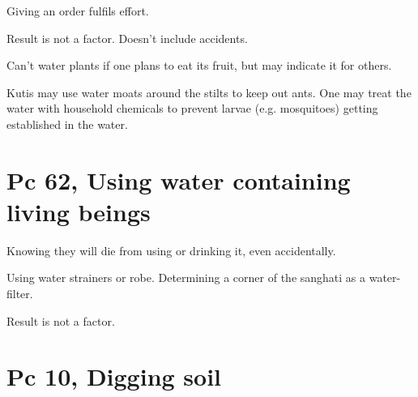 Giving an order fulfils effort.

Result is not a factor. Doesn't include accidents.

Can't water plants if one plans to eat its fruit, but may indicate it
for others.

Kutis may use water moats around the stilts to keep out ants. One may
treat the water with household chemicals to prevent larvae (e.g.
mosquitoes) getting established in the water.

\section{Pc 62, Using water containing living beings}

\enlargethispage{\baselineskip}

Knowing they will die from using or drinking it, even accidentally.

Using water strainers or robe. Determining a corner of the sanghati as a
water-filter.

Result is not a factor.

\clearpage

\section{Pc 10, Digging soil}

